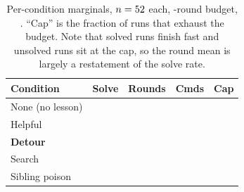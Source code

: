 \begin{table}[t]\centering\small
\caption{Per-condition marginals, $n=52{}$ each, \GtwoMaxRounds{}-round budget,
\GtwoModel{}. ``Cap'' is the fraction of runs that exhaust the budget. Note that solved
runs finish fast and unsolved runs sit at the cap, so the round mean is largely a
restatement of the solve rate.}
\label{tab:latent-marg}
\begin{tabular}{lcccc}
\toprule
Condition & Solve & Rounds & Cmds & Cap \\
\midrule
None (no lesson)      & \GtwoNoneSolve{}    & \GtwoNoneRounds{}    & \GtwoNoneCmds{}    & \GtwoNoneCap{} \\
Helpful               & \GtwoHelpfulSolve{} & \GtwoHelpfulRounds{} & \GtwoHelpfulCmds{} & \GtwoHelpfulCap{} \\
\textbf{Detour}       & \GtwoDetourSolve{}  & \GtwoDetourRounds{}  & \GtwoDetourCmds{}  & \GtwoDetourCap{} \\
Search                & \GtwoSearchSolve{}  & \GtwoSearchRounds{}  & \GtwoSearchCmds{}  & \GtwoSearchCap{} \\
Sibling poison        & \GtwoSiblingSolve{} & \GtwoSiblingRounds{} & \GtwoSiblingCmds{} & \GtwoSiblingCap{} \\
\bottomrule
\end{tabular}
\end{table}

